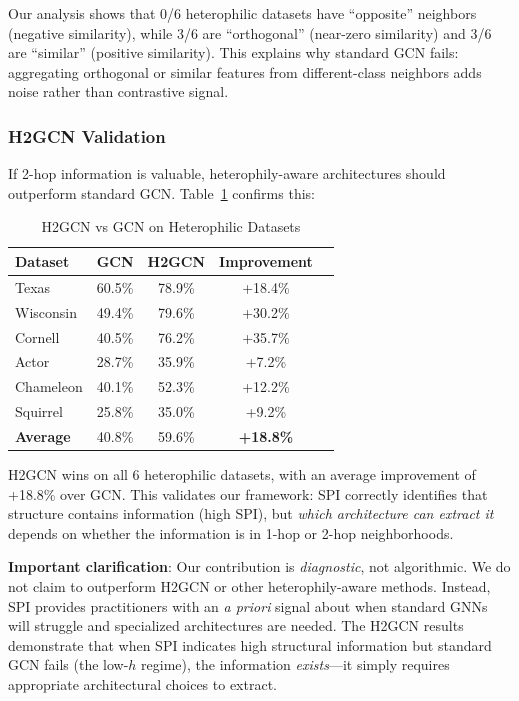 Our analysis shows that 0/6 heterophilic datasets have ``opposite'' neighbors (negative similarity), while 3/6 are ``orthogonal'' (near-zero similarity) and 3/6 are ``similar'' (positive similarity). This explains why standard GCN fails: aggregating orthogonal or similar features from different-class neighbors adds noise rather than contrastive signal.

\subsubsection{H2GCN Validation}

If 2-hop information is valuable, heterophily-aware architectures should outperform standard GCN. Table~\ref{tab:h2gcn_comparison} confirms this:

\begin{table}[h]
\centering
\caption{H2GCN vs GCN on Heterophilic Datasets}
\label{tab:h2gcn_comparison}
\small
\begin{tabular}{@{}lcccc@{}}
\toprule
\textbf{Dataset} & \textbf{GCN} & \textbf{H2GCN} & \textbf{Improvement} \\
\midrule
Texas & 60.5\% & 78.9\% & +18.4\% \\
Wisconsin & 49.4\% & 79.6\% & +30.2\% \\
Cornell & 40.5\% & 76.2\% & +35.7\% \\
Actor & 28.7\% & 35.9\% & +7.2\% \\
Chameleon & 40.1\% & 52.3\% & +12.2\% \\
Squirrel & 25.8\% & 35.0\% & +9.2\% \\
\midrule
\textbf{Average} & 40.8\% & 59.6\% & \textbf{+18.8\%} \\
\bottomrule
\end{tabular}
\end{table}

H2GCN wins on all 6 heterophilic datasets, with an average improvement of +18.8\% over GCN. This validates our framework: SPI correctly identifies that structure contains information (high SPI), but \textit{which architecture can extract it} depends on whether the information is in 1-hop or 2-hop neighborhoods.

\textbf{Important clarification}: Our contribution is \textit{diagnostic}, not algorithmic. We do not claim to outperform H2GCN or other heterophily-aware methods. Instead, SPI provides practitioners with an \textit{a priori} signal about when standard GNNs will struggle and specialized architectures are needed. The H2GCN results demonstrate that when SPI indicates high structural information but standard GCN fails (the low-$h$ regime), the information \textit{exists}---it simply requires appropriate architectural choices to extract.

